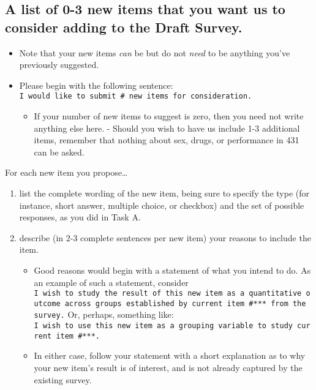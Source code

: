 \documentclass[]{book}
\providecommand{\tightlist}{%
  \setlength{\itemsep}{0pt}\setlength{\parskip}{0pt}}
\theoremstyle{definition}
\theoremstyle{definition}
\theoremstyle{definition}
\theoremstyle{remark}
\begin{document}
\hypertarget{a-list-of-0-3-new-items-that-you-want-us-to-consider-adding-to-the-draft-survey.}{%
\subsection{A list of 0-3 new items that you want us to consider adding
to the Draft
Survey.}\label{a-list-of-0-3-new-items-that-you-want-us-to-consider-adding-to-the-draft-survey.}}

\begin{itemize}
\tightlist
\item
  Note that your new items \emph{can} be but do not \emph{need} to be
  anything you've previously suggested.
\item
  Please begin with the following sentence:
  \texttt{I\ would\ like\ to\ submit\ \#\ new\ items\ for\ consideration.}

  \begin{itemize}
  \tightlist
  \item
    If your number of new items to suggest is zero, then you need not
    write anything else here. - Should you wish to have us include 1-3
    additional items, remember that nothing about sex, drugs, or
    performance in 431 can be asked.
  \end{itemize}
\end{itemize}

For each new item you propose\ldots{}

\begin{enumerate}
\def\labelenumi{\arabic{enumi}.}
\tightlist
\item
  list the complete wording of the new item, being sure to specify the
  type (for instance, short answer, multiple choice, or checkbox) and
  the set of possible responses, as you did in Task A.
\item
  describe (in 2-3 complete sentences per new item) your reasons to
  include the item.

  \begin{itemize}
  \tightlist
  \item
    Good reasons would begin with a statement of what you intend to do.
    As an example of such a statement, consider
    \texttt{I\ wish\ to\ study\ the\ result\ of\ this\ new\ item\ as\ a\ quantitative\ outcome\ across\ groups\ established\ by\ current\ item\ \#***\ from\ the\ survey.}
    Or, perhaps, something like:
    \texttt{I\ wish\ to\ use\ this\ new\ item\ as\ a\ grouping\ variable\ to\ study\ current\ item\ \#***.}
  \item
    In either case, follow your statement with a short explanation as to
    why your new item's result is of interest, and is not already
    captured by the existing survey.
  \end{itemize}
\end{enumerate}
\end{document}

